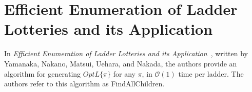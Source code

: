 \section{Efficient Enumeration of Ladder Lotteries and its Application}

In \emph{Efficient Enumeration of Ladder Lotteries and its Application}~\cite{A1}, written by Yamanaka, Nakano, Matsui, Uehara, and Nakada, 
the authors provide an algorithm for generating $OptL\{\pi\}$ 
for any $\pi$, in $\mathcal{O}(1)$ time per ladder. The authors refer to this algorithm as {\sc FindAllChildren}.













